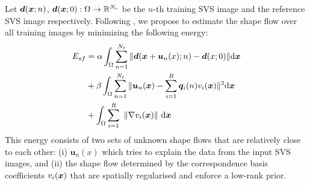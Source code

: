 %


Let $\bm{d}(\boldsymbol{x};n)$, $\bm{d}(\boldsymbol{x};0):\Omega\rightarrow \mathbb{R}^{N_c}$ be the $n$-th training SVS image and the reference SVS image respectively. Following \cite{Garg:2013hu}, we propose to estimate the shape flow over all training images by minimizing the following energy:
\vspace{-5pt}
\begin{align}
E_{sf} & =\alpha
\int_{\Omega}\sum_{n=1}^{N_t} \|\bm{d}(\bx+\bm{u}_n(x);n)-\bm{d}(x;0)\| \ud \bx \label{eq:costfunc}\\
    &+ \beta \int_{\Omega}\sum_{n=1}^{N_t}\|\bm{u}_n(\bx)-\sum_{i=1}^R\bm{q}_i(n)v_i(\bx)\|^2 \ud \bx \label{eq:lowrank}\\
    &+
\int_\Omega  \sum_{i=1}^R \,\, \left \|    \nabla v_i(\bx)    \right \|  \,\ud \bx \label{eq:TVterm}
\vspace{-5pt}
\end{align}
This energy consists of two sets of unknown shape flows that are relatively close to each other: (i) $\bm{u}_n(x)$ which tries to explain the data from the input SVS images, and (ii) the shape flow determined by the correspondence basis coefficients $v_i(\boldsymbol{x})$ that are spatially regularised and enforce a low-rank prior.


